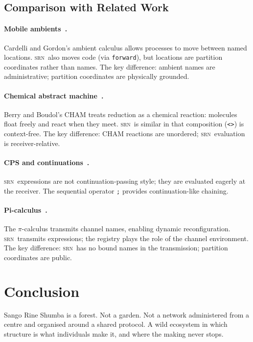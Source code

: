 \documentclass[twocolumn,11pt,a4paper]{article}
\theoremstyle{definition}
\theoremstyle{remark}
\newcommand{\srn}{\textsc{srn}}
\begin{document}
\subsection{Comparison with Related Work}

\paragraph{Mobile ambients~\cite{cardelli2000mobile}.}
Cardelli and Gordon's ambient calculus allows processes to move between
named locations.  \srn\ also moves code (via \texttt{forward}), but
locations are partition coordinates rather than names.  The key
difference: ambient names are administrative; partition coordinates are
physically grounded.

\paragraph{Chemical abstract machine~\cite{berry1992chemical}.}
Berry and Boudol's CHAM treats reduction as a chemical reaction:
molecules float freely and react when they meet.  \srn\ is similar in
that composition (\lstinline|<>|) is context-free.  The key difference:
CHAM reactions are unordered; \srn\ evaluation is receiver-relative.

\paragraph{CPS and continuations~\cite{plotkin1975call}.}
\srn\ expressions are not continuation-passing style; they are
evaluated eagerly at the receiver.  The sequential operator \lstinline|;|
provides continuation-like chaining.

\paragraph{Pi-calculus~\cite{milner1992pi}.}
The $\pi$-calculus transmits channel names, enabling dynamic
reconfiguration.  \srn\ transmits expressions; the registry plays the
role of the channel environment.  The key difference: \srn\ has no
bound names in the transmission; partition coordinates are public.

\section{Conclusion}
\label{sec:conclusion}

Sango Rine Shumba is a forest.  Not a garden.  Not a network
administered from a centre and organised around a shared protocol.
A wild ecosystem in which structure is what individuals make it, and
where the making never stops.
\end{document}
